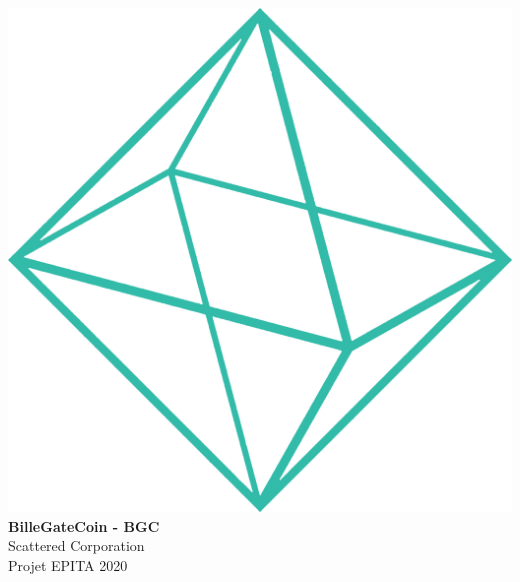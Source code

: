 \documentclass{article}
\begin{document}
\makeatletter
    \begin{titlepage}
        \begin{center}
            \pagecolor{background}
            \color{white}
            \includegraphics[width=0.5\linewidth]{shape.png}\\[10ex]
            {\huge \bfseries BilleGateCoin - BGC}\\[2ex] 
            {\LARGE Scattered Corporation}\\[40ex] 

            {\large Projet EPITA 2020}
        \end{center}
    \end{titlepage}
\makeatother
\thispagestyle{empty}

\newpage
\begin{center}
\color{white}
\tableofcontents
\end{center}
\newpage
\pagecolor{white}
\sectionfont{\color{greendark}}  %

\fancyhf{}
\renewcommand{\headrulewidth}{0pt}
\renewcommand{\footrulewidth}{1pt}
\newcommand\bold[1]{\textcolor{green}{\bfseries{#1}}}
\newcommand\boldblack[1]{\textcolor{background}{\bfseries{#1}}}
\renewcommand{\footrule}{\hbox to\headwidth{\color{green}\leaders\hrule height \footrulewidth\hfill}}

\rfoot{\thepage}
\pagestyle{fancy}
\renewcommand\seriesdefault{l}

\end{document}
